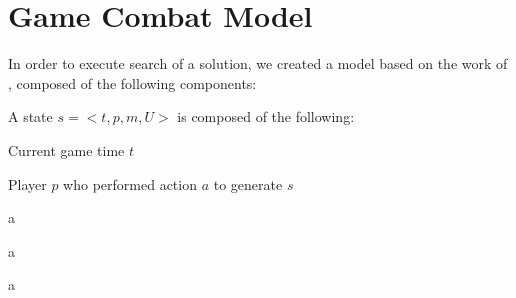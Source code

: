 \section{Game Combat Model}

In order to execute search of a solution, we created a model based on the work of \cite{abcd}, composed of the following components:

\begin{definition}[State]
A state $s=<t,p,m,U>$ is composed of the following:
\begin{shortitem}
\item Current game time $t$
\item Player $p$ who performed action $a$ to generate $s$
\item 
\end{shortitem}
\end{definition}

\begin{definition}[Unit]
a
\end{definition}

\begin{definition}[Action]
a
\end{definition}

\begin{definition}[Effect]
a
\end{definition}

